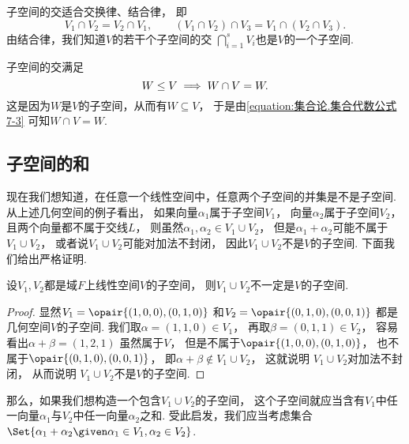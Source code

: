 子空间的交适合交换律、结合律，
即\[
	V_1 \cap V_2
	=V_2 \cap V_1, \qquad
	(V_1 \cap V_2) \cap V_3
	=V_1 \cap (V_2 \cap V_3).
\]
由结合律，我们知道\(V\)的若干个子空间的交
\(\bigcap_{i=1}^s V_i\)也是\(V\)的一个子空间.

子空间的交满足\[
	W \leq V
	\implies
	W \cap V = W.
\]
这是因为\(W\)是\(V\)的子空间，从而有\(W \subseteq V\)，
于是由\cref{equation:集合论.集合代数公式7-3} 可知\(W \cap V = W\).

\subsection{子空间的和}
现在我们想知道，在任意一个线性空间中，任意两个子空间的并集是不是子空间.
从上述几何空间的例子看出，
如果向量\(\alpha_1\)属于子空间\(V_1\)，
向量\(\alpha_2\)属于子空间\(V_2\)，
且两个向量都不属于交线\(L\)，
则虽然\(\alpha_1,\alpha_2 \in V_1 \cup V_2\)，
但是\(\alpha_1 + \alpha_2\)可能不属于\(V_1 \cup V_2\)，
或者说\(V_1 \cup V_2\)可能对加法不封闭，
因此\(V_1 \cup V_2\)不是\(V\)的子空间.
下面我们给出严格证明.
\begin{proposition}
设\(V_1,V_2\)都是域\(F\)上线性空间\(V\)的子空间，
则\(V_1 \cup V_2\)不一定是\(V\)的子空间.
\begin{proof}
显然\(V_1=\opair{(1,0,0),(0,1,0)}\)
和\(V_2=\opair{(0,1,0),(0,0,1)}\)
都是几何空间\(V\)的子空间.
我们取\(\alpha=(1,1,0)\in V_1\)，
再取\(\beta=(0,1,1)\in V_2\)，
容易看出\(\alpha+\beta=(1,2,1)\)
虽然属于\(V\)，
但是不属于\(\opair{(1,0,0),(0,1,0)}\)，
也不属于\(\opair{(0,1,0),(0,0,1)}\)，
即\(\alpha+\beta\notin V_1 \cup V_2\)，
这就说明
\(V_1 \cup V_2\)对加法不封闭，
从而说明
\(V_1 \cup V_2\)不是\(V\)的子空间.
\end{proof}
\end{proposition}
那么，如果我们想构造一个包含\(V_1 \cup V_2\)的子空间，
这个子空间就应当含有\(V_1\)中任一向量\(\alpha_1\)与\(V_2\)中任一向量\(\alpha_2\)之和.
受此启发，我们应当考虑集合
\(\Set{ \alpha_1 + \alpha_2 \given \alpha_1 \in V_1,\alpha_2 \in V_2 }\).

